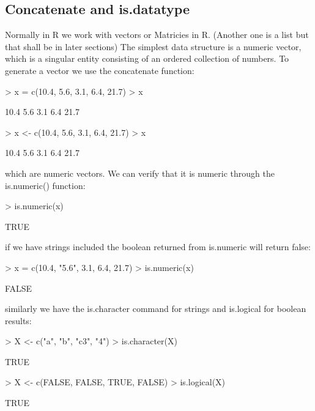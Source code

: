 \documentclass[twoside]{article}
\theoremstyle{definition}
\theoremstyle{definition}
\begin{document}
\subsection{Concatenate and is.datatype}
Normally in R we work with vectors or Matricies in R. (Another one is a list but that shall be in later sections) The simplest data structure is a numeric vector, which is a singular entity consisting of an ordered collection of numbers. To generate a vector we use the concatenate function:
\begin{Schunk}
\begin{Sinput}
> x = c(10.4, 5.6, 3.1, 6.4, 21.7)
> x
\end{Sinput}
\begin{Soutput}
[1] 10.4  5.6  3.1  6.4 21.7
\end{Soutput}
\begin{Sinput}
> x <- c(10.4, 5.6, 3.1, 6.4, 21.7)
> x
\end{Sinput}
\begin{Soutput}
[1] 10.4  5.6  3.1  6.4 21.7
\end{Soutput}
\end{Schunk}
which are numeric vectors. We can verify that it is numeric through the is.numeric() function:
\begin{Schunk}
\begin{Sinput}
> is.numeric(x)
\end{Sinput}
\begin{Soutput}
[1] TRUE
\end{Soutput}
\end{Schunk}
if we have strings included the boolean returned from is.numeric will return false:
\begin{Schunk}
\begin{Sinput}
> x = c(10.4, "5.6", 3.1, 6.4, 21.7)
> is.numeric(x)
\end{Sinput}
\begin{Soutput}
[1] FALSE
\end{Soutput}
\end{Schunk}
similarly we have the is.character command for strings and is.logical for boolean results:
\begin{Schunk}
\begin{Sinput}
> X <- c("a", "b", "c3", "4")
> is.character(X)
\end{Sinput}
\begin{Soutput}
[1] TRUE
\end{Soutput}
\begin{Sinput}
> X <- c(FALSE, FALSE, TRUE, FALSE)
> is.logical(X)
\end{Sinput}
\begin{Soutput}
[1] TRUE
\end{Soutput}
\end{Schunk}
\end{document}
